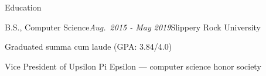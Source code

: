 \documentclass{resume} %
\begin{document}
\begin{rSection}{Education}

\begin{rSubsection}{B.S., Computer Science}{\em Aug.\ 2015 - May 2019}{Slippery Rock University}{}
\item Graduated summa cum laude (GPA: 3.84/4.0)
\item Vice President of Upsilon Pi Epsilon — computer science honor society
\end{rSubsection}

\end{rSection}




\end{document}
